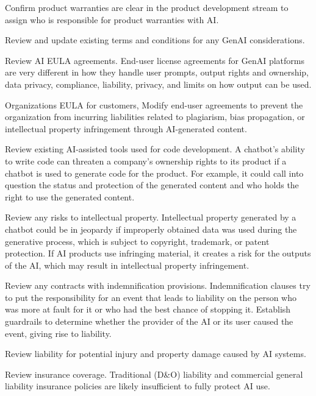 \begin{minipage}{\linewidth}
\begin{checklist}
  \item Confirm product warranties are clear in the product development stream
  to assign who is responsible for product warranties with AI.
  \item Review and update existing terms and conditions for any GenAI
  considerations.
  \item Review AI EULA agreements. End-user license agreements for GenAI
  platforms are very different in how they handle user prompts, output rights
  and ownership, data privacy, compliance, liability, privacy, and limits on
  how output can be used.
  \item Organizations EULA for customers, Modify end-user agreements to prevent
  the organization from incurring liabilities related to plagiarism, bias
  propagation, or intellectual property infringement through AI-generated
  content.
  \item Review existing AI-assisted tools used for code development.
  A chatbot's ability to write code can threaten a company's ownership rights
  to its product if a chatbot is used to generate code for the product. For
  example, it could call into question the status and protection of the
   generated content and who holds the right to use the generated content.
  \item Review any risks to intellectual property. Intellectual property
  generated by a chatbot could be in jeopardy if improperly obtained data was
  used during the generative process, which is subject to copyright, trademark,
  or patent protection. If AI products use infringing material, it creates a
  risk for the outputs of the AI, which may result in intellectual property
  infringement.
  \item Review any contracts with indemnification provisions. Indemnification
  clauses try to put the responsibility for an event that leads to liability on
  the person who was more at fault for it or who had the best chance of
  stopping it. Establish guardrails to determine whether the provider of the
  AI or its user caused the event, giving rise to liability.
  \item Review liability for potential injury and property damage caused by AI
  systems.
  \item Review insurance coverage. Traditional (D\&O) liability and commercial
  general liability insurance policies are likely insufficient to fully protect
  AI use.

\end{checklist}
\end{minipage}
